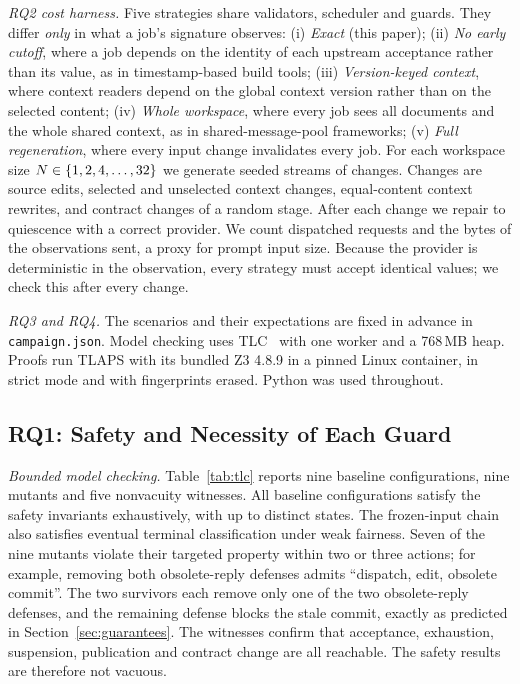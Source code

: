 \documentclass[10pt,journal,compsoc]{IEEEtran}
\theoremstyle{plain}
\theoremstyle{definition}
\begin{document}
\emph{RQ2 cost harness.} Five strategies share validators, scheduler and guards. They differ \emph{only} in what a job's signature observes:
(i) \emph{Exact} (this paper);
(ii) \emph{No early cutoff}, where a job depends on the identity of each upstream acceptance rather than its value, as in timestamp-based build tools;
(iii) \emph{Version-keyed context}, where context readers depend on the global context version rather than on the selected content;
(iv) \emph{Whole workspace}, where every job sees all documents and the whole shared context, as in shared-message-pool frameworks;
(v) \emph{Full regeneration}, where every input change invalidates every job.
For each workspace size $N\in\{1,2,4,\ldots,32\}$ we generate \CostSeeds{} seeded streams of \CostChanges{} changes. Changes are source edits, selected and unselected context changes, equal-content context rewrites, and contract changes of a random stage. After each change we repair to quiescence with a correct provider. We count dispatched requests and the bytes of the observations sent, a proxy for prompt input size. Because the provider is deterministic in the observation, every strategy must accept identical values; we check this after every change.

\emph{RQ3 and RQ4.} The \Scenarios{} scenarios and their expectations are fixed in advance in \texttt{campaign.json}. Model checking uses TLC~\cite{yu1999tlc} with one worker and a 768\,MB heap. Proofs run TLAPS with its bundled Z3 4.8.9 in a pinned Linux container, in strict mode and with fingerprints erased. Python \PythonVersion{} was used throughout.

\subsection{RQ1: Safety and Necessity of Each Guard}\label{sec:rq1}
\emph{Bounded model checking.} Table~\ref{tab:tlc} reports nine baseline configurations, nine mutants and five nonvacuity witnesses. All baseline configurations satisfy the safety invariants exhaustively, with up to \TLCMaxStates{} distinct states. The frozen-input chain also satisfies eventual terminal classification under weak fairness. Seven of the nine mutants violate their targeted property within two or three actions; for example, removing both obsolete-reply defenses admits ``dispatch, edit, obsolete commit''. The two survivors each remove only one of the two obsolete-reply defenses, and the remaining defense blocks the stale commit, exactly as predicted in Section~\ref{sec:guarantees}. The witnesses confirm that acceptance, exhaustion, suspension, publication and contract change are all reachable. The safety results are therefore not vacuous.
\end{document}
